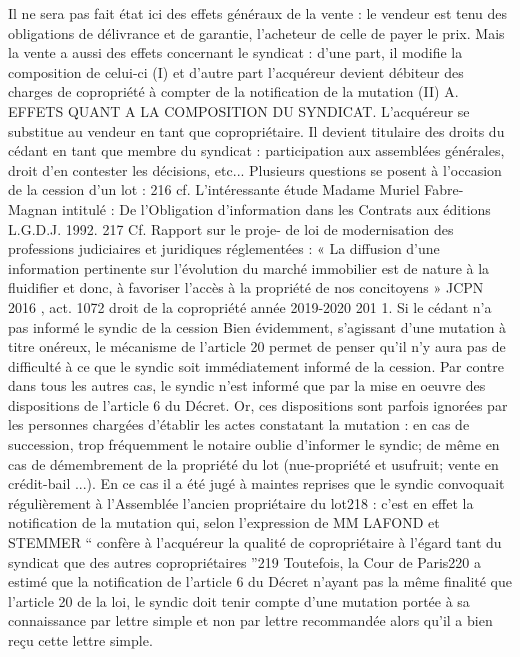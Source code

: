 	Il ne sera pas fait état ici des effets généraux de la vente : le vendeur est tenu des obligations de délivrance
	et de garantie, l'acheteur de celle de payer le prix.
	Mais la vente a aussi des effets concernant le syndicat : d’une part, il modifie la composition de celui-ci (I)
	et d’autre part l’acquéreur devient débiteur des charges de copropriété à compter de la notification de la
	mutation (II)
	A. EFFETS QUANT A LA COMPOSITION DU SYNDICAT.
	L'acquéreur se substitue au vendeur en tant que copropriétaire. Il devient titulaire des droits du cédant en
	tant que membre du syndicat : participation aux assemblées générales, droit d'en contester les décisions,
	etc...
	Plusieurs questions se posent à l’occasion de la cession d’un lot :
	216 cf. L'intéressante étude Madame Muriel Fabre-Magnan intitulé : De l'Obligation d'information dans les Contrats aux éditions L.G.D.J.
	1992.
	217 Cf. Rapport  sur le proje- de loi de modernisation des professions judiciaires et juridiques réglementées : « La diffusion d’une
	information pertinente sur l’évolution du marché immobilier est de nature à la fluidifier et donc, à favoriser l’accès à la propriété de nos
	concitoyens » JCPN 2016 , act. 1072
	droit de la copropriété année 2019-2020
	201
	1. Si le cédant n'a pas informé le syndic de la cession
	Bien évidemment, s'agissant d'une mutation à titre onéreux, le mécanisme de l'article 20 permet de penser
	qu'il n'y aura pas de difficulté à ce que le syndic soit immédiatement informé de la cession. Par contre dans
	tous les autres cas, le syndic n'est informé que par la mise en oeuvre des dispositions de l'article 6 du
	Décret.
	Or, ces dispositions sont parfois ignorées par les personnes chargées d'établir les actes constatant la
	mutation : en cas de succession, trop fréquemment le notaire oublie d’informer le syndic; de même en cas
	de démembrement de la propriété du lot (nue-propriété et usufruit; vente en crédit-bail ...).
	En ce cas il a été jugé à maintes reprises que le syndic convoquait régulièrement à l'Assemblée l'ancien
	propriétaire du lot218 : c’est en effet la notification de la mutation qui, selon l’expression de MM LAFOND
	et STEMMER “ confère à l’acquéreur la qualité de copropriétaire à l’égard tant du syndicat que des autres
	copropriétaires ”219
	Toutefois, la Cour de Paris220 a estimé que la notification de l’article 6 du Décret n’ayant pas la même
	finalité que l’article 20 de la loi, le syndic doit tenir compte d’une mutation portée à sa connaissance par
	lettre simple et non par lettre recommandée alors qu’il a bien reçu cette lettre simple.
